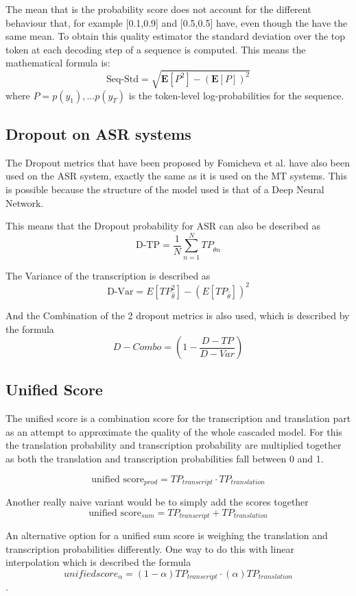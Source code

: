 The mean that is the probability score does not account for the different behaviour that, for example [0.1,0.9] and [0.5,0.5] have, even though the have the same mean. 
To obtain this quality estimator the standard deviation over the top token at each decoding step of a sequence is computed.
This means the mathematical formula is: $$\text{Seq-Std}=\sqrt{\mathbf{E}[P^2]-(\mathbf{E}[P])^2}$$ where $P=p(y_1) , \dots p(y_T)$ is the token-level log-probabilities for the sequence.


\subsection{Dropout on ASR systems}
The Dropout metrics that have been proposed by Fomicheva et al. have also been used on the ASR system, exactly the same as it is used on the MT systems. This is possible because the structure of the model used is that of a Deep Neural Network. 

This means that the Dropout probability for ASR can also be described as $$\text{D-TP}=\frac{1}{N}\sum_{n=1}^N TP_{\hat\theta n}$$

The Variance of the transcription is described as $$\text{D-Var}=E[TP_{\hat\theta}^2]-(E[TP_{\hat\theta}])^2$$

And the Combination of the 2 dropout metrics is also used, which is described by the formula $$D-Combo=(1-\frac{D-TP}{D-Var})$$

\subsection{Unified Score}\label{methods:unified scores}
The unified score is a combination score for the transcription and translation part as an attempt to approximate the quality of the whole cascaded model. 
For this the translation probability and transcription probability are multiplied together as both the translation and transcription probabilities fall between 0 and 1. 

$$\text{unified score}_{prod}= TP_{transcript}\cdot TP_{translation}$$

Another really naive variant would be to simply add the scores together
$$\text{unified score}_{sum}= TP_{transcript}+TP_{translation}$$

An alternative option for a unified sum score is weighing the translation and transcription probabilities differently. One way to do this with linear interpolation which is described the formula $$unifiedscore_\alpha= (1-\alpha) TP_{transcript} \cdot (\alpha)TP_{translation}$$.

